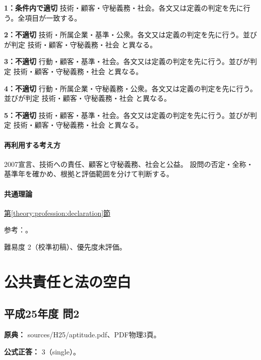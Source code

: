 \noindent\textbf{1：条件内で適切} 技術・顧客・守秘義務・社会。各文又は定義の判定を先に行う。全項目が一致する。\par

\noindent\textbf{2：不適切} 技術・所属企業・基準・公衆。各文又は定義の判定を先に行う。並びが判定 技術・顧客・守秘義務・社会 と異なる。\par

\noindent\textbf{3：不適切} 行動・顧客・基準・社会。各文又は定義の判定を先に行う。並びが判定 技術・顧客・守秘義務・社会 と異なる。\par

\noindent\textbf{4：不適切} 行動・所属企業・守秘義務・公衆。各文又は定義の判定を先に行う。並びが判定 技術・顧客・守秘義務・社会 と異なる。\par

\noindent\textbf{5：不適切} 技術・顧客・基準・社会。各文又は定義の判定を先に行う。並びが判定 技術・顧客・守秘義務・社会 と異なる。\par

\paragraph{再利用する考え方} 2007宣言、技術への責任、顧客と守秘義務、社会と公益。 設問の否定・全称・基準年を確かめ、根拠と評価範囲を分けて判断する。

\paragraph{共通理論} \hyperref[theory:profession:declaration]{第\ref*{theory:profession:declaration}節}

\par 参考：\cite{eth54_profession2007}。

\par 難易度 2（校準初稿）、優先度未評価。

\section{公共責任と法の空白}

\subsection{平成25年度 問2}
\label{q:h25-reg-apt-02}

\noindent\textbf{原典：} sources/H25/aptitude.pdf、PDF物理3頁。

\textbf{公式正答：} 3（single）。

